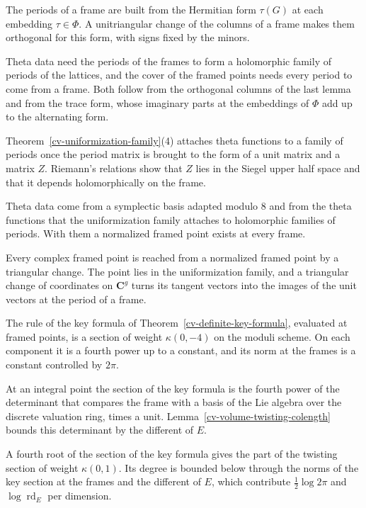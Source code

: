 The periods of a frame are built from the Hermitian form $\tau(G)$ at each embedding $\tau\in\Phi$. A unitriangular
change of the columns of a frame makes them orthogonal for this form, with signs fixed by the minors.

Theta data need the periods of the frames to form a holomorphic family of periods of the lattices, and the cover of
the framed points needs every period to come from a frame. Both follow from the orthogonal columns of the last lemma
and from the trace form, whose imaginary parts at the embeddings of $\Phi$ add up to the alternating form.

Theorem~\ref{cv-uniformization-family}(4) attaches theta functions to a family of periods once the period matrix is
brought to the form of a unit matrix and a matrix $Z$. Riemann's relations show that $Z$ lies in the Siegel upper half
space and that it depends holomorphically on the frame.

Theta data come from a symplectic basis adapted modulo $8$ and from the theta functions that the uniformization
family attaches to holomorphic families of periods. With them a normalized framed point exists at every frame.

Every complex framed point is reached from a normalized framed point by a triangular change. The point lies in the
uniformization family, and a triangular change of coordinates on $\mathbf C^g$ turns its tangent vectors into the
images of the unit vectors at the period of a frame.

The rule of the key formula of Theorem~\ref{cv-definite-key-formula}, evaluated at framed points, is a
section of weight $\kappa(0,-4)$ on the moduli scheme. On each component it is a fourth power up to a
constant, and its norm at the frames is a constant controlled by $2\pi$.

At an integral point the section of the key formula is the fourth power of the determinant that compares
the frame with a basis of the Lie algebra over the discrete valuation ring, times a unit.
Lemma~\ref{cv-volume-twisting-colength} bounds this determinant by the different of $E$.

A fourth root of the section of the key formula gives the part of the twisting section of weight
$\kappa(0,1)$. Its degree is bounded below through the norms of the key section at the frames and the
different of $E$, which contribute $\frac12\log2\pi$ and $\log\operatorname{rd}_E$ per dimension.

